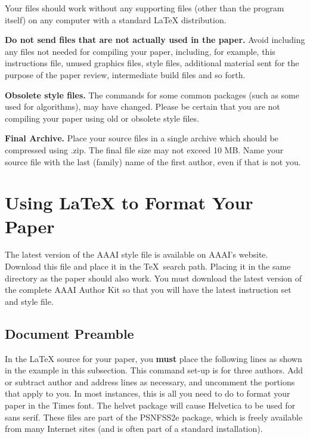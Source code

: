 \documentclass[letterpaper]{article} %
\begin{document}
Your files should work without any supporting files (other than the
program itself) on any computer with a standard {\LaTeX} distribution.

\textbf{Do not send files that are not actually used in the paper.}
Avoid including any files not needed for compiling your paper,
including, for example, this instructions file, unused graphics files,
style files, additional material sent for the purpose of the paper
review, intermediate build files and so forth.

\textbf{Obsolete style files.} The commands for some common packages
(such as some used for algorithms), may have changed. Please be certain
that you are not compiling your paper using old or obsolete style files.

\textbf{Final Archive.} Place your source files in a single archive
which should be compressed using .zip. The final file size may not
exceed 10 MB. Name your source file with the last (family) name of the
first author, even if that is not you.

\section{\texorpdfstring{Using {\LaTeX} to Format Your
Paper}{Using  to Format Your Paper}}\label{using-to-format-your-paper}

The latest version of the AAAI style file is available on AAAI's
website. Download this file and place it in the \TeX~search path.
Placing it in the same directory as the paper should also work. You must
download the latest version of the complete AAAI Author Kit so that you
will have the latest instruction set and style file.

\subsection{Document Preamble}

In the \LaTeX{} source for your paper, you \textbf{must} place the
following lines as shown in the example in this subsection. This command
set-up is for three authors. Add or subtract author and address lines as
necessary, and uncomment the portions that apply to you. In most
instances, this is all you need to do to format your paper in the Times
font. The helvet package will cause Helvetica to be used for sans serif.
These files are part of the PSNFSS2e package, which is freely available
from many Internet sites (and is often part of a standard installation).
\end{document}
